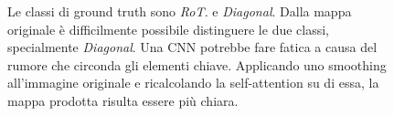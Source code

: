 \begin{figure}[b]
    \begin{subfigure}{0.35\textwidth}
        \raggedright
    \end{subfigure}
    \hspace{1cm}
    \begin{subfigure}{0.35\textwidth}
        \raggedleft
    \end{subfigure}
    
    
    \caption{Le classi di ground truth sono \textit{RoT.} e \textit{Diagonal}. Dalla mappa originale è difficilmente possibile distinguere le due classi, specialmente \textit{Diagonal}. Una CNN potrebbe fare fatica a causa del rumore che circonda gli elementi chiave. Applicando uno smoothing all'immagine originale e ricalcolando la self-attention su di essa, la mappa prodotta risulta essere più chiara.}
    \label{fig:att_rumorosa}
\end{figure}

